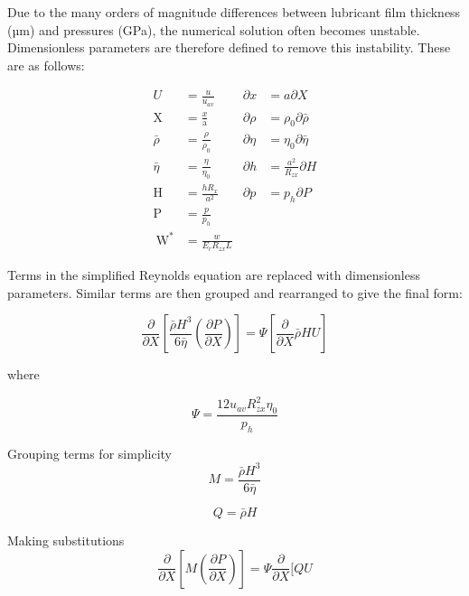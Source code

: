 Due to the many orders of magnitude differences between lubricant film thickness (µm) and pressures (GPa), the numerical solution often becomes unstable. Dimensionless parameters are therefore defined to remove this instability. These are as follows:

\begin{equation}\label{eq3.3}
	\begin{aligned}
		U &=\frac{u}{u_{a v}} & \partial x &=a \partial X \\
		\mathrm{X} &=\frac{x}{\mathrm{a}} & \partial \rho &=\rho_{0} \partial \bar{\rho} \\
		\bar{\rho} &=\frac{\rho}{\rho_{0}} & \partial \eta &=\eta_{0} \partial \bar{\eta} \\
		\bar{\eta} &=\frac{\eta}{\eta_{0}} & \partial h &=\frac{a^{2}}{R_{z x}} \partial H \\
		\mathrm{H} &=\frac{h R_{x}}{a^{2}} & \partial p &=p_{h} \partial P \\
		\mathrm{P} &=\frac{p}{p_{h}} & \\
		\mathrm{~W}^{*} &=\frac{w}{E_{r} R_{z x} L} &
	\end{aligned}
\end{equation}

Terms in the simplified Reynolds equation are replaced with dimensionless parameters. Similar terms are then grouped and rearranged to give the final form:

\begin{equation}\label{eq3.4}
	\frac{\partial}{\partial X}\left[\frac{\bar{\rho} H^{3}}{6 \bar{\eta}}\left(\frac{\partial P}{\partial X}\right)\right]=\Psi\left[\frac{\partial}{\partial X} \bar{\rho} H U\right]
\end{equation}

where

\begin{equation}\label{eq3.5}
	\Psi=\frac{12 u_{a v} R_{z x}^{2} \eta_{0}}{p_{h}}
\end{equation}

Grouping terms for simplicity
\begin{equation}\label{eq3.6}
	M=\frac{\bar{\rho} H^{3}}{6 \bar{\eta}}
\end{equation}

\begin{equation}\label{eq3.7}
	Q=\bar{\rho} H
\end{equation}

Making substitutions
\begin{equation}\label{eq3.8}
	\frac{\partial}{\partial X}\left[M\left(\frac{\partial P}{\partial X}\right)\right]=\Psi \frac{\partial}{\partial X}[Q U
\end{equation}

